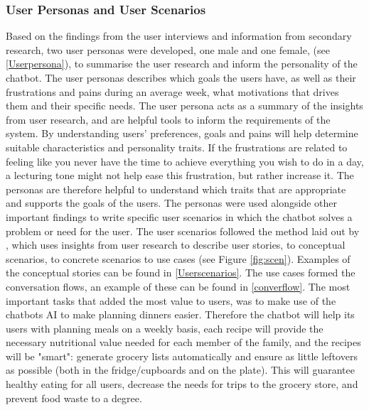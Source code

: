     \subsubsection{User Personas and User Scenarios}
        \label{persscen}
    Based on the findings from the user interviews and information from secondary research, two user personas were developed, one male and one female, (see \ref{Userpersona}), to summarise the user research and inform the personality of the chatbot. The user personas describes which goals the users have, as well as their frustrations and pains during an average week, what motivations that drives them and their specific needs. The user persona acts as a summary of the insights from user research, and are helpful tools to inform the requirements of the system. By understanding users' preferences, goals and pains will help determine suitable characteristics and personality traits. If the frustrations are related to feeling like you never have the time to achieve everything you wish to do in a day, a lecturing tone might not help ease this frustration, but rather increase it. The personas are therefore helpful to understand which traits that are appropriate and supports the goals of the users. The personas were used alongside other important findings to write specific user scenarios in which the chatbot solves a problem or need for the user. The user scenarios followed the method laid out by \cite{Benyon2014}, which uses insights from user research to describe user stories, to conceptual scenarios, to concrete scenarios to use cases (see Figure \ref{fig:scen}). Examples of the conceptual stories can be found in \ref{Userscenarios}. The use cases formed the conversation flows, an example of these can be found in \ref{converflow}. The most important tasks that added the most value to users, was to make use of the chatbots AI to make planning dinners easier. Therefore the chatbot will help its users with planning meals on a weekly basis, each recipe will provide the necessary nutritional value needed for each member of the family, and the recipes will be "smart": generate grocery lists automatically and ensure as little leftovers as possible (both in the fridge/cupboards and on the plate). This will guarantee healthy eating for all users, decrease the needs for trips to the grocery store, and prevent food waste to a degree.
    
